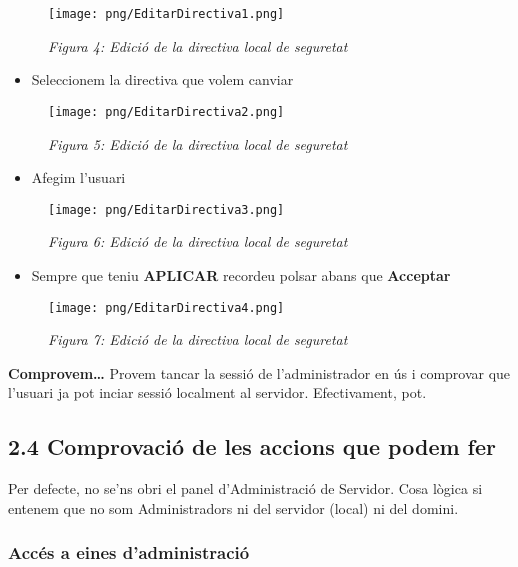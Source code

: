 \documentclass[
  a4paper,
]{article}
\providecommand{\tightlist}{%
  \setlength{\itemsep}{0pt}\setlength{\parskip}{0pt}}
\begin{document}
\begin{figure}
\centering
\texttt{[image: png/EditarDirectiva1.png]}
\caption{\emph{Figura 4: Edició de la directiva local de seguretat}}
\end{figure}

\begin{itemize}
\tightlist
\item
  Seleccionem la directiva que volem canviar
\end{itemize}

\begin{figure}
\centering
\texttt{[image: png/EditarDirectiva2.png]}
\caption{\emph{Figura 5: Edició de la directiva local de seguretat}}
\end{figure}

\begin{itemize}
\tightlist
\item
  Afegim l'usuari
\end{itemize}

\begin{figure}
\centering
\texttt{[image: png/EditarDirectiva3.png]}
\caption{\emph{Figura 6: Edició de la directiva local de seguretat}}
\end{figure}

\begin{itemize}
\tightlist
\item
  Sempre que teniu \textbf{APLICAR} recordeu polsar abans que
  \textbf{Acceptar}
\end{itemize}

\begin{figure}
\centering
\texttt{[image: png/EditarDirectiva4.png]}
\caption{\emph{Figura 7: Edició de la directiva local de seguretat}}
\end{figure}

\textbf{Comprovem\ldots{}} Provem tancar la sessió de l'administrador en
ús i comprovar que l'usuari ja pot inciar sessió localment al servidor.
Efectivament, pot.

\subsection{2.4 Comprovació de les accions que podem
fer}\label{comprovaciuxf3-de-les-accions-que-podem-fer}

Per defecte, no se'ns obri el panel d'Administració de Servidor. Cosa
lògica si entenem que no som Administradors ni del servidor (local) ni
del domini.

\subsubsection{Accés a eines
d'administració}\label{accuxe9s-a-eines-dadministraciuxf3}
\end{document}
